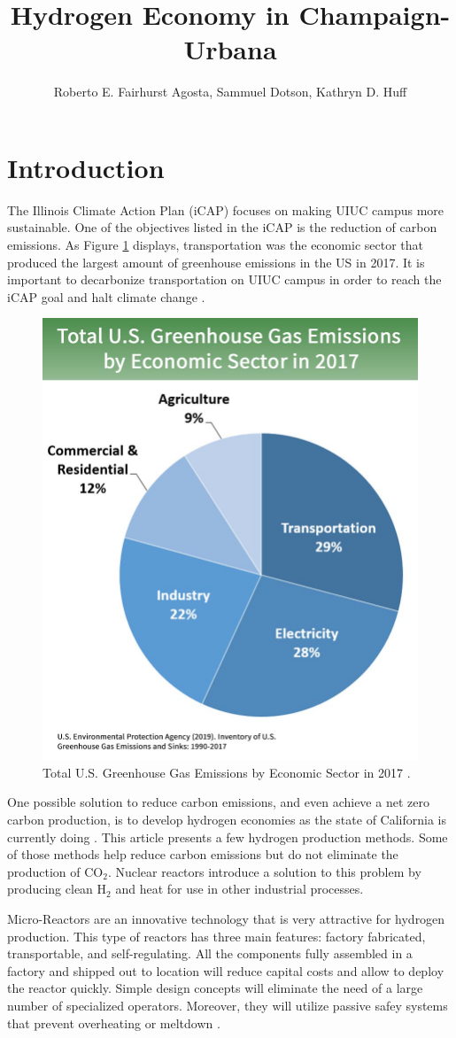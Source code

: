 \documentclass{anstrans}
\title{Hydrogen Economy in Champaign-Urbana}
\author{Roberto E. Fairhurst Agosta, Sammuel Dotson, Kathryn D. Huff}
\institute{
University of Illinois at Urbana-Champaign, Dept. of Nuclear, Plasma, and Radiological Engineering\\
ref3@illinois.edu
}
\begin{document}
\section{Introduction}

The Illinois Climate Action Plan (iCAP) focuses on making UIUC campus more sustainable. One of the objectives listed in the iCAP is the reduction of carbon emissions. As Figure \ref{fig:ghg} displays, transportation was the economic sector that produced the largest amount of greenhouse emissions in the US in 2017. It is important to decarbonize transportation on UIUC campus in order to reach the iCAP goal and halt climate change \cite{noauthor_illlinois_2015}.

\begin{figure}[H]
	\centering
	\includegraphics[width=0.6\linewidth]{figures/total-ghg-2019-caption.jpg}
	\hfill
	\caption{Total U.S. Greenhouse Gas Emissions by Economic Sector in 2017 \cite{us_epa_sources_2020}.}
	\label{fig:ghg}
\end{figure}

One possible solution to reduce carbon emissions, and even achieve a net zero carbon production, is to develop hydrogen economies as the state of California is currently doing \cite{brown_economic_2013}. This article presents a few hydrogen production methods. Some of those methods help reduce carbon emissions but do not eliminate the production of CO$_2$. Nuclear reactors introduce a solution to this problem by producing clean H$_2$ and heat for use in other industrial processes.

Micro-Reactors are an innovative technology that is very attractive for hydrogen production. This type of reactors has three main features: factory fabricated, transportable, and self-regulating. All the components fully assembled in a factory and shipped out to location will reduce capital costs and allow to deploy the reactor quickly. Simple design concepts will eliminate the need of a large number of specialized operators. Moreover, they will utilize passive safey systems that prevent overheating or meltdown \cite{noauthor_ultimate_2019}.
\end{document}
